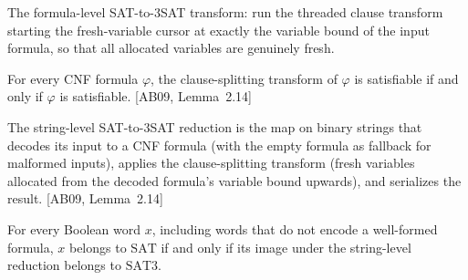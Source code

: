 \begin{definition}
\label{Complexity.satTransform}
\leanok
{}
The formula-level SAT-to-3SAT transform: run the threaded clause transform starting
the fresh-variable cursor at exactly the variable bound of the input formula, so
that all allocated variables are genuinely fresh.
\end{definition}

\begin{lemma}
\label{Complexity.satTransform_equisat}
\leanok
{}
For every CNF formula $\varphi$, the clause-splitting transform of $\varphi$ is
satisfiable if and only if $\varphi$ is satisfiable. [AB09, Lemma~2.14]
\end{lemma}

\begin{definition}
\label{Complexity.satReduction}
\leanok
{}
The string-level SAT-to-3SAT reduction is the map on binary strings that decodes
its input to a CNF formula (with the empty formula as fallback for malformed
inputs), applies the clause-splitting transform (fresh variables allocated from
the decoded formula's variable bound upwards), and serializes the result.
[AB09, Lemma~2.14]
\end{definition}

\begin{lemma}
\label{Complexity.satReduction_correct}
\leanok
{}
For every Boolean word $x$, including words that do not encode a well-formed formula,
$x$ belongs to $\mathrm{SAT}$ if and only if its image under the string-level reduction
belongs to $\mathrm{SAT3}$.
\end{lemma}

